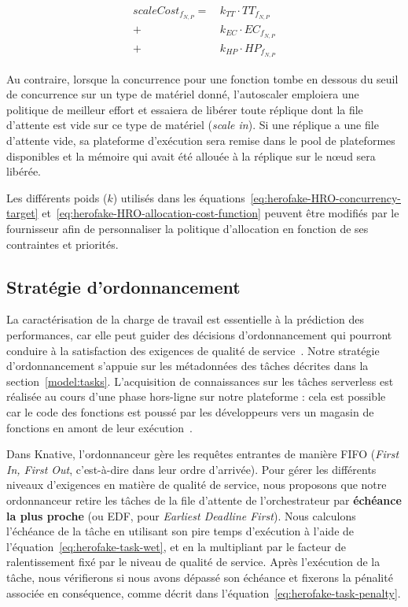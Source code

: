 \begin{equation}
\begin{split}
    scaleCost_{{f}_{N, P}} = \, &k_{TT} \cdot {TT}_{{f}_{N, P}} \\
    + &k_{EC} \cdot {EC}_{{f}_{N, P}} \\
    + &k_{HP} \cdot {HP}_{{f}_{N, P}}
\end{split}
\label{eq:herofake-HRO-allocation-cost-function}
\end{equation}

Au contraire, lorsque la concurrence pour une fonction tombe en dessous du seuil de concurrence sur un type de matériel donné, l'autoscaler emploiera une politique de meilleur effort et essaiera de libérer toute réplique dont la file d'attente est vide sur ce type de matériel (\textit{scale in}). Si une réplique a une file d'attente vide, sa plateforme d'exécution sera remise dans le pool de plateformes disponibles et la mémoire qui avait été allouée à la réplique sur le nœud sera libérée.

Les différents poids ($k$) utilisés dans les équations~\ref{eq:herofake-HRO-concurrency-target} et~\ref{eq:herofake-HRO-allocation-cost-function} peuvent être modifiés par le fournisseur afin de personnaliser la politique d'allocation en fonction de ses contraintes et priorités.

\subsection{Stratégie d'ordonnancement} \label{section:herofake-scheduling-strategy}

La caractérisation de la charge de travail est essentielle à la prédiction des performances, car elle peut guider des décisions d'ordonnancement qui pourront conduire à la satisfaction des exigences de qualité de service~\cite{mampageHolisticViewResource2022}. Notre stratégie d'ordonnancement s'appuie sur les métadonnées des tâches décrites dans la section~\ref{model:tasks}. L'acquisition de connaissances sur les tâches serverless est réalisée au cours d'une phase hors-ligne sur notre plateforme : cela est possible car le code des fonctions est poussé par les développeurs vers un magasin de fonctions en amont de leur exécution~\cite{shahradServerlessWildCharacterizing}.

Dans Knative, l'ordonnanceur gère les requêtes entrantes de manière FIFO (\textit{First In, First Out}, c'est-à-dire dans leur ordre d'arrivée). Pour gérer les différents niveaux d'exigences en matière de qualité de service, nous proposons que notre ordonnanceur retire les tâches de la file d'attente de l'orchestrateur par \textbf{échéance la plus proche} (ou EDF, pour \textit{Earliest Deadline First}). Nous calculons l'échéance de la tâche en utilisant son pire temps d'exécution à l'aide de l'équation~\ref{eq:herofake-task-wet}, et en la multipliant par le facteur de ralentissement fixé par le niveau de qualité de service. Après l'exécution de la tâche, nous vérifierons si nous avons dépassé son échéance et fixerons la pénalité associée en conséquence, comme décrit dans l'équation~\ref{eq:herofake-task-penalty}. 

